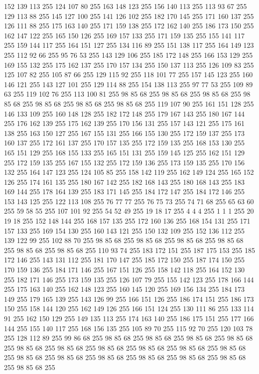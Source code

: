 152 139 113 255 124 107 80 255 163 148 123 255 156 140 113 255 113 93 67 255 129 113 88 255 145 127 100 255 141 126 102 255 182 170 145 255 171 160 137 255 126 111 88 255 175 163 140 255 171 159 138 255 172 162 140 255 186 173 150 255 162 147 122 255 165 150 126 255 169 157 133 255 171 159 135 255 155 141 117 255 159 144 117 255 164 151 127 255 134 116 89 255 151 138 117 255 164 149 123 255 112 92 66 255 95 76 53 255 143 129 106 255 185 172 148 255 166 153 129 255 169 155 132 255 175 162 137 255 170 157 134 255 150 137 113 255 126 109 83 255 125 107 82 255 105 87 66 255 129 115 92 255 118 101 77 255 157 145 123 255 160 146 121 255 143 127 101 255 129 114 88 255 154 138 113 255 97 77 53 255 109 89 63 255 119 102 76 255 113 100 81 255 98 85 68 255 98 85 68 255 98 85 68 255 98 85 68 255 98 85 68 255 98 85 68 255 98 85 68 255 119 107 90 255 161 151 128 255 146 133 109 255 160 148 128 255 182 172 148 255 179 167 143 255 180 167 144 255 176 162 139 255 175 162 139 255
170 156 131 255 157 143 121 255 175 161 138 255 163 150 127 255 167 155 131 255 166 155 130 255 172 159 137 255 173 160 137 255 172 161 137 255 170 157 135 255 172 159 135 255 168 153 130 255 165 151 129 255 168 155 133 255 165 151 131 255 159 145 125 255 162 151 129 255 172 159 135 255 167 155 132 255 172 159 136 255 173 159 135 255 170 156 132 255 164 147 123 255 124 105 85 255 158 142 119 255 162 149 124 255 165 152 126 255 174 161 135 255 180 167 142 255 182 168 143 255 180 168 143 255 183 169 144 255 178 164 139 255 183 171 145 255 184 172 147 255 184 172 146 255 153 143 125 255 122 113 108 255 76 77 77 255 76 75 73 255 74 71 68 255 65 63 60 255 59 58 55 255 107 101 92 255 54 52 49 255 19 18 17 255 4 4 4 255 1 1 1 255 20 19 18 255 152 148 144 255 168 157 135 255 172 160 136 255 168 154 131 255 171 157 133 255 169 154 130 255 160 143 121 255 150 132 109 255 152 136 112 255 139 122 99 255 102 88 70 255 98 85 68 255 98 85 68 255 98 85 68 255 98 85 68 255
98 85 68 255 98 85 68 255 110 93 74 255 183 172 151 255 187 175 153 255 185 172 146 255 143 131 112 255 181 170 147 255 185 172 150 255 187 174 150 255 170 159 136 255 184 171 146 255 167 151 126 255 158 142 118 255 164 152 130 255 182 171 146 255 173 159 135 255 126 107 79 255 155 142 123 255 178 166 144 255 175 163 140 255 162 148 123 255 160 145 120 255 169 156 134 255 184 173 149 255 179 165 139 255 143 126 99 255 166 151 126 255 186 174 151 255 186 173 150 255 158 144 120 255 162 149 126 255 166 151 124 255 130 111 86 255 133 114 91 255 162 150 129 255 149 135 113 255 174 163 140 255 186 175 151 255 177 166 144 255 155 140 117 255 168 156 135 255 105 89 70 255 115 92 70 255 120 103 78 255 128 112 89 255 99 86 68 255 98 85 68 255 98 85 68 255 98 85 68 255 98 85 68 255 98 85 68 255 98 85 68 255 98 85 68 255 98 85 68 255 98 85 68 255 98 85 68 255 98 85 68 255 98 85 68 255 98 85 68 255 98 85 68 255 98 85 68 255 98 85 68 255 98 85 68 255
